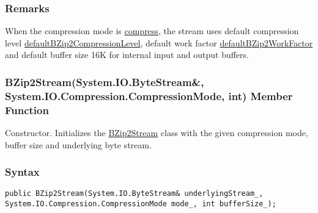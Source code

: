 \documentclass[a4paper,oneside,11.000000pt]{book}
\begin{document}
\subsubsection*{Remarks}
\begin{flushleft}
When the compression mode is \hyperlink{System.IO.Compression.CompressionMode.compress}{compress}, the stream uses default compression level \hyperlink{System.IO.Compression.defaultBZip2CompressionLevel}{defaultBZip2CompressionLevel}, 
default work factor \hyperlink{System.IO.Compression.defaultBZip2WorkFactor}{defaultBZip2WorkFactor} and default buffer size 16K for internal input and output buffers.

\end{flushleft}
\clearpage

\hypertarget{System.IO.Compression.BZip2Stream.constructor.P.System.IO.Compression.BZip2Stream.R.System.IO.ByteStream.System.IO.Compression.CompressionMode.int}{\subsubsection*{BZip2Stream(System.IO.ByteStream\&, System.IO.Compression.CompressionMode, int) Member Function}}
\begin{flushleft}
Constructor. Initializes the \hyperlink{System.IO.Compression.BZip2Stream}{BZip2Stream} class with the given compression mode, buffer size and underlying byte stream.

\end{flushleft}
\subsubsection*{Syntax}
\texttt{public BZip2Stream(System.IO.ByteStream\& underlyingStream\_, System.IO.Compression.CompressionMode mode\_, int bufferSize\_);}
\end{document}
